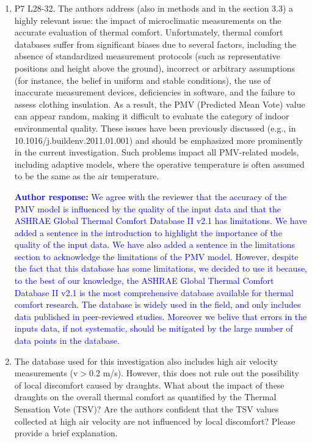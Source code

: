 \documentclass[a4paper, 10pt]{letter}
\newcommand{\response}[1]{\textcolor{blue}{\textbf{Author response:} #1}}
\begin{document}
\begin{letter}
\begin{enumerate}
            \item P7 L28-32.
            The authors address (also in methods and in the section 3.3) a highly relevant issue: the impact of microclimatic measurements on the accurate evaluation of thermal comfort.
            Unfortunately, thermal comfort databases suffer from significant biases due to several factors, including the absence of standardized measurement protocols (such as representative positions and height above the ground), incorrect or arbitrary assumptions (for instance, the belief in uniform and stable conditions), the use of inaccurate measurement devices, deficiencies in software, and the failure to assess clothing insulation.
            As a result, the PMV (Predicted Mean Vote) value can appear random, making it difficult to evaluate the category of indoor environmental quality.
            These issues have been previously discussed (e.g., in 10.1016/j.buildenv.2011.01.001) and should be emphasized more prominently in the current investigation.
            Such problems impact all PMV-related models, including adaptive models, where the operative temperature is often assumed to be the same as the air temperature.

            \response{
                We agree with the reviewer that the accuracy of the PMV model is influenced by the quality of the input data and that the ASHRAE Global Thermal Comfort Database II v2.1 has limitations.
                We have added a sentence in the introduction to highlight the importance of the quality of the input data.
                We have also added a sentence in the limitations section to acknowledge the limitations of the PMV model.
                However, despite the fact that this database has some limitations, we decided to use it because, to the best of our knowledge, the ASHRAE Global Thermal Comfort Database II v2.1 is the most comprehensive database available for thermal comfort research.
                The database is widely used in the field, and only includes data published in peer-reviewed studies.
                Moreover we belive that errors in the inputs data, if not systematic, should be mitigated by the large number of data points in the database.
            }

            \item The database used for this investigation also includes high air velocity measurements (v$>$0.2 m/s).
            However, this does not rule out the possibility of local discomfort caused by draughts.
            What about the impact of these draughts on the overall thermal comfort as quantified by the Thermal Sensation Vote (TSV)?
            Are the authors confident that the TSV values collected at high air velocity are not influenced by local discomfort?
            Please provide a brief explanation.


\end{enumerate}
\end{letter}
\end{document}

